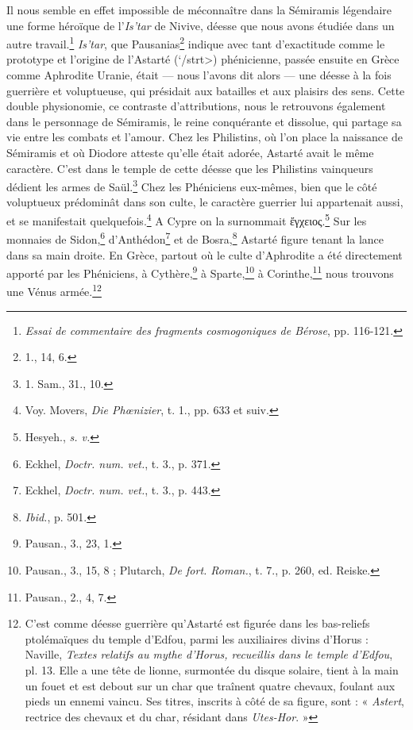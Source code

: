 \documentclass[a4paper, 11pt, oneside, landscape]{article}
\begin{document}
Il nous semble en effet impossible de méconnaître dans la Sémiramis légendaire une forme héroïque de l'\emph{Is'tar} de Nivive, déesse que nous avons étudiée dans un autre travail.\footnote{\emph{Essai de commentaire des fragments cosmogoniques de Bérose}, pp. 116-121.} \emph{Is'tar}, que Pausanias\footnote{1., 14, 6.} indique avec tant d'exactitude comme le prototype et l'origine de l'Astarté (\<`/strt>) phénicienne, passée ensuite en Grèce comme Aphrodite Uranie, était --- nous l'avons dit alors --- une déesse à la fois guerrière et voluptueuse, qui présidait aux batailles et aux plaisirs des sens. Cette double physionomie, ce contraste d'attributions, nous le retrouvons également dans le personnage de Sémiramis, le reine conquérante et dissolue, qui partage sa vie entre les combats et l'amour. Chez les Philistins, où l'on place la naissance de Sémiramis et où Diodore atteste qu'elle était adorée, Astarté avait le même caractère. C'est dans le temple de cette déesse que les Philistins vainqueurs dédient les armes de Saül.\footnote{1. Sam., 31., 10.} Chez les Phéniciens eux-mêmes, bien que le côté voluptueux prédominât dans son culte, le caractère guerrier lui appartenait aussi, et se manifestait quelquefois.\footnote{Voy. Movers, \emph{Die Phœnizier}, t. 1., pp. 633 et suiv.} A Cypre on la surnommait ἔγχειος.\footnote{Hesyeh., \emph{s. v.}} Sur les monnaies de Sidon,\footnote{Eckhel, \emph{Doctr. num. vet.}, t. 3., p. 371.} d'Anthédon\footnote{Eckhel, \emph{Doctr. num. vet.}, t. 3., p. 443.} et de Bosra,\footnote{\emph{Ibid.}, p. 501.} Astarté figure tenant la lance dans sa main droite. En Grèce, partout où le culte d'Aphrodite a été directement apporté par les Phéniciens, à Cythère,\footnote{Pausan., 3., 23, 1.} à Sparte,\footnote{Pausan., 3., 15, 8 ; Plutarch, \emph{De fort. Roman.}, t. 7., p. 260, ed. Reiske.} à Corinthe,\footnote{Pausan., 2., 4, 7.} nous trouvons une Vénus armée.\footnote{C'est comme déesse guerrière qu'Astarté est figurée dans les bas-reliefs ptolémaïques du temple d'Edfou, parmi les auxiliaires divins d'Horus : Naville, \emph{Textes relatifs au mythe d'Horus, recueillis dans le temple d'Edfou}, pl. 13. Elle a une tête de lionne, surmontée du disque solaire, tient à la main un fouet et est debout sur un char que traînent quatre chevaux, foulant aux pieds un ennemi vaincu. Ses titres, inscrits à côté de sa figure, sont : « \emph{Astert}, rectrice des chevaux et du char, résidant dans \emph{Utes-Hor}. »}
\end{document}
